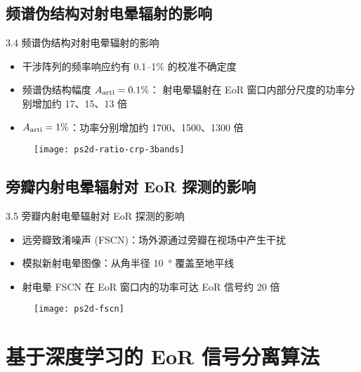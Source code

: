 \documentclass{beamer}
\begin{document}
\subsection{频谱伪结构对射电晕辐射的影响}

\begin{frame}{3.4 频谱伪结构对射电晕辐射的影响}
  \begin{itemize}
    \item 干涉阵列的频率响应约有 0.1--1\% 的校准不确定度
    \item \alert{频谱伪结构}幅度 $A_{\text{arti}} = 0.1\%$：
      射电晕辐射在 EoR 窗口内部分尺度的功率分别增加约 17、15、13 倍
    \item $A_{\text{arti}} = 1\%$：功率分别增加约 1700、1500、1300 倍
  \end{itemize}
  \vspace{-1ex}
  \begin{figure}
    \centering
    \texttt{[image: ps2d-ratio-crp-3bands]}
  \end{figure}
\end{frame}

\subsection{旁瓣内射电晕辐射对 EoR 探测的影响}

\begin{frame}{3.5 旁瓣内射电晕辐射对 EoR 探测的影响}
  \begin{itemize}
    \item \alert{远旁瓣致淆噪声 (FSCN)}：场外源通过旁瓣在视场中产生干扰
    \item 模拟新射电晕图像：从角半径 \SI{10}{\degree} 覆盖至地平线
    \item 射电晕 FSCN 在 EoR 窗口内的功率可达 EoR 信号约 20 倍
  \end{itemize}
  \begin{figure}
    \centering
    \texttt{[image: ps2d-fscn]}
  \end{figure}
\end{frame}


\section{基于深度学习的 EoR 信号分离算法}
\end{document}
